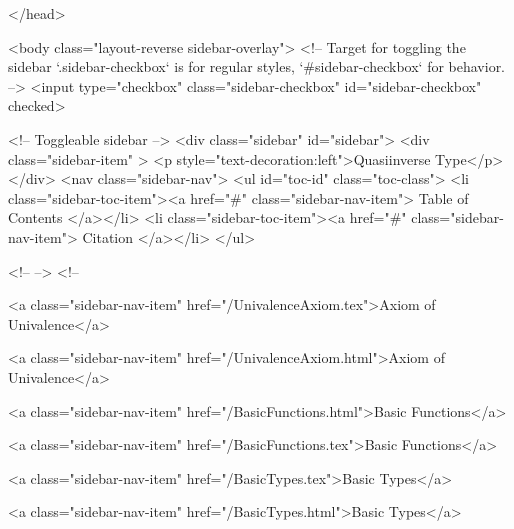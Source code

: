   
</head>




  <body class="layout-reverse sidebar-overlay">
    <!-- Target for toggling the sidebar `.sidebar-checkbox` is for regular
     styles, `#sidebar-checkbox` for behavior. -->
<input type="checkbox" class="sidebar-checkbox" id="sidebar-checkbox" checked>

<!-- Toggleable sidebar -->
<div class="sidebar" id="sidebar">
  <div class="sidebar-item" >
    <p style="text-decoration:left">Quasiinverse Type</p>
  </div>
  <nav class="sidebar-nav">
    <ul id="toc-id" class="toc-class">
  <li class="sidebar-toc-item"><a href="#" class="sidebar-nav-item"> Table of Contents </a></li>
  <li class="sidebar-toc-item"><a href="#" class="sidebar-nav-item"> Citation </a></li>
</ul>


    <!--  -->
    <!-- 
      
    
      
    
      
    
      
    
      
        
      
    
      
        
          <a class="sidebar-nav-item" href="/UnivalenceAxiom.tex">Axiom of Univalence</a>
        
      
    
      
        
          <a class="sidebar-nav-item" href="/UnivalenceAxiom.html">Axiom of Univalence</a>
        
      
    
      
        
          <a class="sidebar-nav-item" href="/BasicFunctions.html">Basic Functions</a>
        
      
    
      
        
          <a class="sidebar-nav-item" href="/BasicFunctions.tex">Basic Functions</a>
        
      
    
      
        
          <a class="sidebar-nav-item" href="/BasicTypes.tex">Basic Types</a>
        
      
    
      
        
          <a class="sidebar-nav-item" href="/BasicTypes.html">Basic Types</a>
        
      
    
